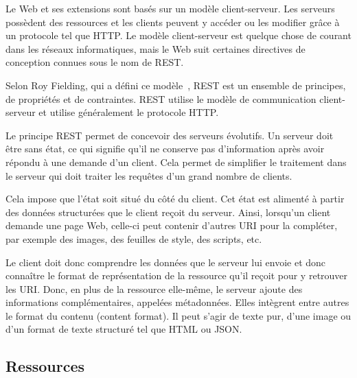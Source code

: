   Le Web et ses extensions sont basés sur un modèle client-serveur. Les serveurs possèdent des ressources et les clients peuvent y accéder ou les modifier grâce à un protocole tel que \ac{HTTP}. Le modèle client-serveur est quelque chose de courant dans les réseaux informatiques, mais le Web suit certaines directives de conception connues sous le nom de \ac{REST}.

Selon Roy Fielding, qui a défini ce modèle~\cite{rest}, \ac{REST} est un ensemble de principes, de propriétés et de contraintes. \ac{REST} utilise le modèle de communication client-serveur et utilise généralement le protocole \ac{HTTP}.

Le principe \ac{REST} permet de concevoir des serveurs évolutifs. Un serveur doit être sans état, ce qui signifie qu’il ne conserve pas d’information après avoir répondu à une demande d’un client. Cela permet de simplifier le traitement dans le serveur qui doit traiter les requêtes d'un grand nombre de clients. 

Cela impose que l’état soit situé du côté du client. Cet état est alimenté à partir des données structurées que le client reçoit du serveur. Ainsi, lorsqu’un client demande une page Web, celle-ci peut contenir d’autres \ac{URI} pour la compléter, par exemple des images, des feuilles de style, des scripts, etc.

Le client doit donc comprendre les données que le serveur lui envoie et donc connaître le format de représentation de la ressource qu'il reçoit pour y retrouver les \ac{URI}. Donc, en plus de la ressource elle-même, le serveur ajoute des informations complémentaires, appelées métadonnées. Elles intègrent entre autres le format du contenu (content format). Il peut s’agir de texte pur, d’une image ou d’un format de texte structuré tel que \ac{HTML} ou \ac{JSON}.
  
      \vspace{1em}

\subsection{Ressources}

    \vspace{1em}

